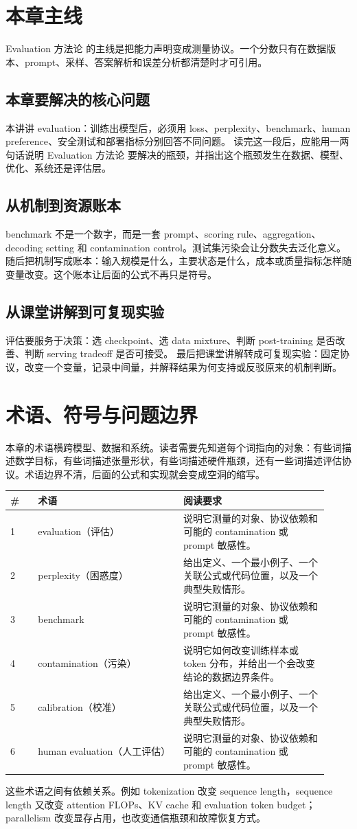 \documentclass[a4paper]{article}
\begin{document}
\section{本章主线}
Evaluation 方法论 的主线是把能力声明变成测量协议。一个分数只有在数据版本、prompt、采样、答案解析和误差分析都清楚时才可引用。
\subsection{本章要解决的核心问题}
本讲讲 evaluation：训练出模型后，必须用 loss、perplexity、benchmark、human preference、安全测试和部署指标分别回答不同问题。
读完这一段后，应能用一两句话说明 Evaluation 方法论 要解决的瓶颈，并指出这个瓶颈发生在数据、模型、优化、系统还是评估层。
\subsection{从机制到资源账本}
benchmark 不是一个数字，而是一套 prompt、scoring rule、aggregation、decoding setting 和 contamination control。测试集污染会让分数失去泛化意义。
随后把机制写成账本：输入规模是什么，主要状态是什么，成本或质量指标怎样随变量改变。这个账本让后面的公式不再只是符号。
\subsection{从课堂讲解到可复现实验}
评估要服务于决策：选 checkpoint、选 data mixture、判断 post-training 是否改善、判断 serving tradeoff 是否可接受。
最后把课堂讲解转成可复现实验：固定协议，改变一个变量，记录中间量，并解释结果为何支持或反驳原来的机制判断。
\section{术语、符号与问题边界}
本章的术语横跨模型、数据和系统。读者需要先知道每个词指向的对象：有些词描述数学目标，有些词描述张量形状，有些词描述硬件瓶颈，还有一些词描述评估协议。术语边界不清，后面的公式和实现就会变成空洞的缩写。
\begin{longtable}{p{0.08\linewidth}p{0.42\linewidth}p{0.42\linewidth}}
\toprule
\textbf{\#} & \textbf{术语} & \textbf{阅读要求}\\
\midrule
1 & evaluation（评估） & 说明它测量的对象、协议依赖和可能的 contamination 或 prompt 敏感性。\\
2 & perplexity（困惑度） & 给出定义、一个最小例子、一个关联公式或代码位置，以及一个典型失败情形。\\
3 & benchmark & 说明它测量的对象、协议依赖和可能的 contamination 或 prompt 敏感性。\\
4 & contamination（污染） & 说明它如何改变训练样本或 token 分布，并给出一个会改变结论的数据边界条件。\\
5 & calibration（校准） & 给出定义、一个最小例子、一个关联公式或代码位置，以及一个典型失败情形。\\
6 & human evaluation（人工评估） & 说明它测量的对象、协议依赖和可能的 contamination 或 prompt 敏感性。\\
\bottomrule
\end{longtable}
这些术语之间有依赖关系。例如 tokenization 改变 sequence length，sequence length 又改变 attention FLOPs、KV cache 和 evaluation token budget；parallelism 改变显存占用，也改变通信瓶颈和故障恢复方式。
\end{document}
